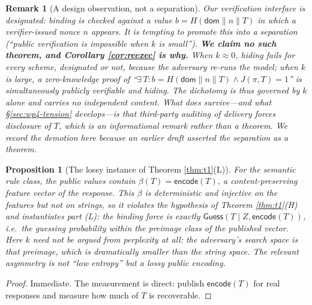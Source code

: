 \documentclass[journal]{IEEEtran}
\newtheorem{proposition}[theorem]{Proposition}
\newtheorem{remark}[theorem]{Remark}
\newcommand{\need}[1]{}
\newcommand{\fixme}[1]{}
\newcommand{\need}[1]{\textcolor{blue}{[[ NEED: #1 ]]}}
\newcommand{\fixme}[1]{\textcolor{orange}{[[ FIX: #1 ]]}}
\begin{document}
\fixme{原 docs/sp1-zk-audit.md §4 写的是"熵(~10^2--10^3 bit)远低于 256 bit，
因此枚举可行"——这是非因果推论（2^100 与 2^256 一样枚举不了；真正的攻击是\textbf{重执行}，
对手的已知信息是 (prompt, 模型, 解码参数)）。
2026-10-12 已全库改正，docs/tdsc-fixlist.md §G 的 G1--G6 逐条结案。}

\begin{remark}[A design observation, not a separation]
\label{rem:designated}
Our verification interface is \emph{designated}: binding is checked against a
value $b = H(\mathsf{dom}\|n\|T)$ in which a verifier-issued nonce $n$ appears.
It is tempting to promote this into a separation (``public verification is
impossible when $k$ is small''). \textbf{We claim no such theorem, and
Corollary \ref{cor:reexec} is why.} When $k \approx 0$, hiding fails for
\emph{every} scheme, designated or not, because the adversary re-runs the
model; when $k$ is large, a zero-knowledge proof of ``$\exists\, T : b =
H(\mathsf{dom}\|n\|T) \wedge J(\pi, T) = 1$'' is simultaneously publicly
verifiable and hiding. The dichotomy is thus governed by $k$ alone and carries
no independent content. What does survive---and what
\S\ref{sec:wp4-tension}
develops---is that \emph{third-party auditing of delivery} forces disclosure of
$T$, which is an informational remark rather than a theorem. We record the
demotion here because an earlier draft asserted the separation as a theorem.
\end{remark}

\need{\textbf{This is retrospective justification, not a novel construction.}
The system publishes $b = H(\mathsf{dom}\|n\|T)$ with a verifier-issued nonce
$n$, and Remark \ref{rem:designated} explains the shape of that choice. The
security model does not pin down whether $n$ is public; making it public
forfeits hiding, and making it verifier-held is what makes verification
designated.}

\need{\textbf{实验内容}：实测 $k$。对一组真实 prompt、同一模型多次采样，
估 $\mathsf{Guess}(T\mid Z)$（Definition \ref{def:k}），代入
Theorem \ref{thm:t1}(H) 得阈值。
据先例扫查，\emph{没有人测过这个量}——它本身是一块贡献。}

\begin{proposition}[The lossy instance of Theorem \ref{thm:t1}(L)]
\label{prop:semantic}
For the semantic rule class, the public values contain $\beta(T) =
\mathsf{encode}(T)$, a content-preserving feature vector of the response. This
$\beta$ is deterministic and injective on the features but not on strings, so
it violates the hypothesis of Theorem \ref{thm:t1}(H) and instantiates part
(L): the binding force is exactly
$\mathsf{Guess}(T \mid Z, \mathsf{encode}(T))$, i.e.\ the guessing probability
\emph{within the preimage class} of the published vector. Here $k$ need not be
argued from perplexity at all: the adversary's search space is that preimage,
which is dramatically smaller than the string space. The relevant asymmetry is
not ``low entropy'' but a \emph{lossy public encoding}.
\end{proposition}
\begin{proof}
Immediate. The measurement is direct: publish $\mathsf{encode}(T)$ for real
responses and measure how much of $T$ is recoverable.
\end{proof}
\end{document}
